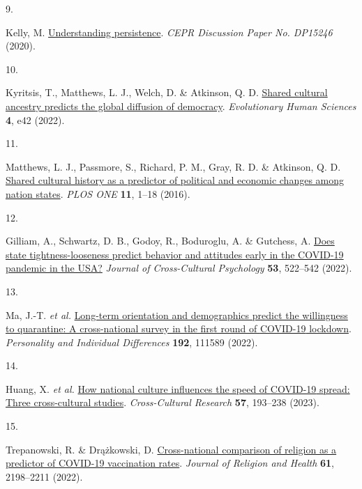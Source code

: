 \documentclass[
  man, donotrepeattitle,floatsintext]{apa6}
\newlength{\cslhangindent}
\newlength{\csllabelwidth}
\newlength{\cslentryspacingunit} %
\newenvironment{CSLReferences}[2] %
 {%
  \setlength{\parindent}{0pt}
  \ifodd #1
  \let\oldpar\par
  \def\par{\hangindent=\cslhangindent\oldpar}
  \fi
  \setlength{\parskip}{#2\cslentryspacingunit}
 }%
 {}
\newcommand{\CSLLeftMargin}[1]{\parbox[t]{\csllabelwidth}{#1}}
\newcommand{\CSLRightInline}[1]{\parbox[t]{\linewidth - \csllabelwidth}{#1}\break}
\begin{document}
\begin{CSLReferences}{0}{0}
\leavevmode{}%
\CSLLeftMargin{9. }%
\CSLRightInline{Kelly, M. \href{http://ssrn.com/abstract=3688200}{Understanding persistence}. \emph{CEPR Discussion Paper No. DP15246} (2020).}

\leavevmode{}%
\CSLLeftMargin{10. }%
\CSLRightInline{Kyritsis, T., Matthews, L. J., Welch, D. \& Atkinson, Q. D. \href{https://doi.org/10.1017/ehs.2022.40}{Shared cultural ancestry predicts the global diffusion of democracy}. \emph{Evolutionary Human Sciences} \textbf{4}, e42 (2022).}

\leavevmode{}%
\CSLLeftMargin{11. }%
\CSLRightInline{Matthews, L. J., Passmore, S., Richard, P. M., Gray, R. D. \& Atkinson, Q. D. \href{https://doi.org/10.1371/journal.pone.0152979}{Shared cultural history as a predictor of political and economic changes among nation states}. \emph{PLOS ONE} \textbf{11}, 1--18 (2016).}

\leavevmode{}%
\CSLLeftMargin{12. }%
\CSLRightInline{Gilliam, A., Schwartz, D. B., Godoy, R., Boduroglu, A. \& Gutchess, A. \href{https://doi.org/10.1177/00220221221077710}{Does state tightness-looseness predict behavior and attitudes early in the {COVID-19} pandemic in the USA?} \emph{Journal of Cross-Cultural Psychology} \textbf{53}, 522--542 (2022).}

\leavevmode{}%
\CSLLeftMargin{13. }%
\CSLRightInline{Ma, J.-T. \emph{et al.} \href{https://doi.org/10.1016/j.paid.2022.111589}{Long-term orientation and demographics predict the willingness to quarantine: A cross-national survey in the first round of {COVID-19} lockdown}. \emph{Personality and Individual Differences} \textbf{192}, 111589 (2022).}

\leavevmode{}%
\CSLLeftMargin{14. }%
\CSLRightInline{Huang, X. \emph{et al.} \href{https://doi.org/10.1177/10693971221141478}{How national culture influences the speed of {COVID-19} spread: Three cross-cultural studies}. \emph{Cross-Cultural Research} \textbf{57}, 193--238 (2023).}

\leavevmode{}%
\CSLLeftMargin{15. }%
\CSLRightInline{Trepanowski, R. \& Drążkowski, D. \href{https://doi.org/10.1007/s10943-022-01569-7}{Cross-national comparison of religion as a predictor of {COVID-19} vaccination rates}. \emph{Journal of Religion and Health} \textbf{61}, 2198--2211 (2022).}


\end{CSLReferences}
\end{document}
